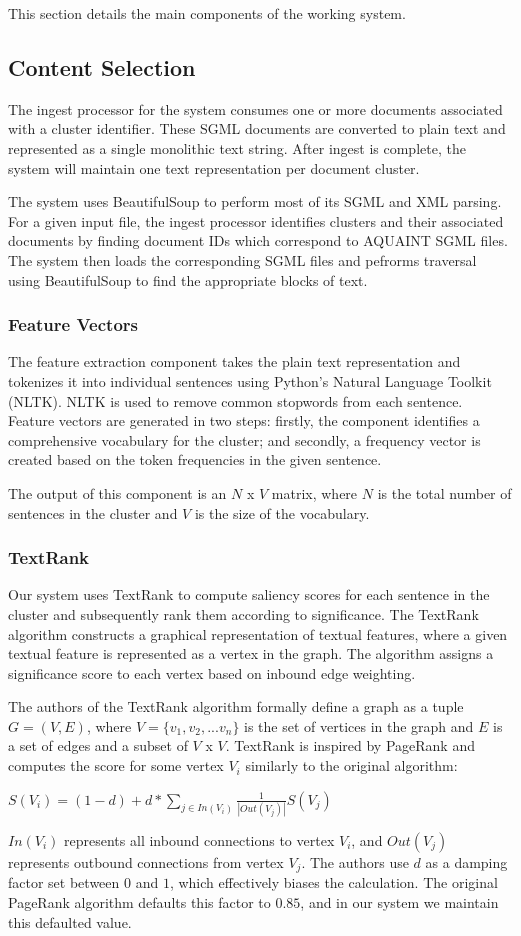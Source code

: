 \documentclass[11pt]{article}
\begin{document}
	This section details the main components of the working system.
	
	\subsection{Content Selection}
	The ingest processor for the system consumes one or more documents associated with a cluster identifier. These SGML documents are converted to plain text and represented as a single monolithic text string. After ingest is complete, the system will maintain one text representation per document cluster.
	
	The system uses BeautifulSoup to perform most of its SGML and XML parsing. For a given input file, the ingest processor identifies clusters and their associated documents by finding document IDs which correspond to AQUAINT SGML files. The system then loads the corresponding SGML files and pefrorms traversal using BeautifulSoup to find the appropriate blocks of text.
	\subsubsection{Feature Vectors}
	The feature extraction component takes the plain text representation and tokenizes it into individual sentences using Python's Natural Language Toolkit (NLTK). NLTK is used to remove common stopwords from each sentence. Feature vectors are generated in two steps: firstly, the component identifies a comprehensive vocabulary for the cluster; and secondly, a frequency vector is created based on the token frequencies in the given sentence. 
	
	The output of this component is an $N$ x $V$ matrix, where $N$ is the total number of sentences in the cluster and $V$ is the size of the vocabulary. 
	\subsubsection{TextRank}
	Our system uses TextRank to compute saliency scores for each sentence in the cluster and subsequently rank them according to significance. The TextRank algorithm constructs a graphical representation of textual features, where a given textual feature is represented as a vertex in the graph. The algorithm assigns a significance score to each vertex based on inbound edge weighting.
	
	The authors of the TextRank algorithm formally define a graph as a tuple $G = (V,E)$, where $V = \{v_1, v_2, ... v_n\}$ is the set of vertices in the graph and $E$ is a set of edges and a subset of $V$ x $V$. TextRank is inspired by PageRank and computes the score for some vertex $V_i$ similarly to the original algorithm:
	\begin{center}
		$S(V_i) = (1 - d) + d * \sum_{j \in In(V_i)} \frac{1}{|Out(V_j)|}S(V_j)$
	\end{center}
	$In(V_i)$ represents all inbound connections to vertex $V_i$, and $Out(V_j)$ represents outbound connections from vertex $V_j$. The authors use $d$ as a damping factor set between $0$ and $1$, which effectively biases the calculation. The original PageRank algorithm defaults this factor to $0.85$, and in our system we maintain this defaulted value.
	
\end{document}
